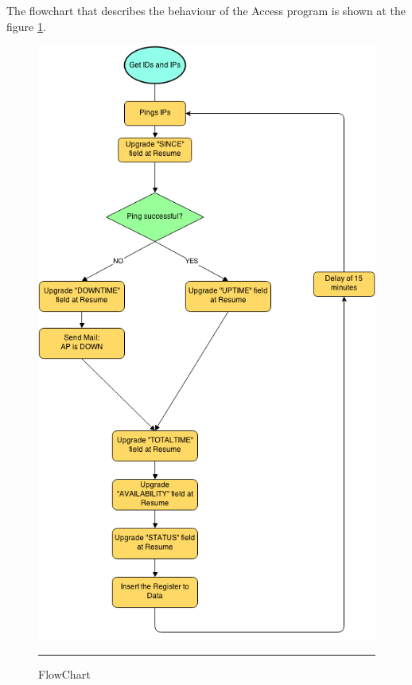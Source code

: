 \documentclass[12pt, a4paper,twoside]{tesi_upf}
\begin{document}
            The flowchart that describes the behaviour of the Access program is shown at the figure \ref{fig:accessp}. 
            \begin{figure}[htbp]
              \centering
                  \includegraphics[scale=0.5]{./figures/Flowchart.png}
                  \rule{32em}{0.5pt}
              \caption[Access Program FlowChart]{FlowChart}
              \label{fig:accessp}
            \end{figure}
        
\end{document}
